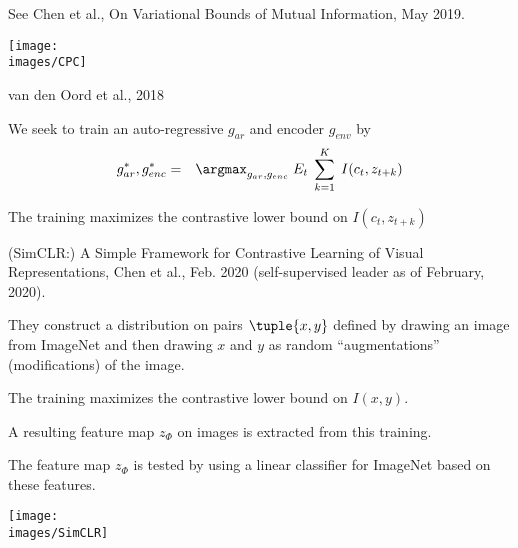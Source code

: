 {See Chen et al., On Variational Bounds of Mutual Information, May 2019.


{\huge

\centerline{\texttt{[image: \\images/CPC]}}

\centerline{van den Oord et al., 2018}

\vfill

We seek to train an auto-regressive $g_{ar}$ and encoder $g_{env}$ by
\begin{eqnarray*}
g_{ar}^*,g_{enc}^* & = & \argmax_{g_{ar},g_{enc}}\;E_t  \;\sum_{k=1}^K \;I(c_t,z_{t+k})
\end{eqnarray*}
}

\vfill
The training maximizes the contrastive lower bound on $I(c_t,z_{t+k})$


(SimCLR:) A Simple Framework for Contrastive Learning of Visual Representations, Chen et al., Feb. 2020 (self-supervised leader as of February, 2020).

\vfill
They construct a distribution on pairs $\tuple{x,y}$ defined by drawing an image from ImageNet and then drawing $x$ and $y$ as random ``augmentations'' (modifications) of the image.

\vfill
The training maximizes the contrastive lower bound on $I(x,y)$.


A resulting feature map $z_\Phi$ on images is extracted from this training.

\vfill
The feature map $z_\Phi$ is tested by using a {\color{red} linear} classifier for ImageNet based on these features.


\centerline{\texttt{[image: \\images/SimCLR]}}


}


